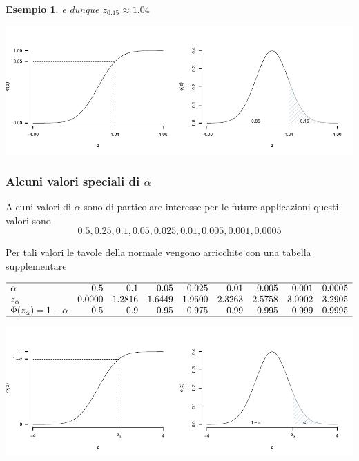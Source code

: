 \documentclass[
  11pt,
]{book}
\theoremstyle{mytheoremstyle}
\theoremstyle{mydefstyle}
\newtheorem{example}{{Esempio}}[section]
\begin{document}
\begin{example}
e dunque \(z_{0.15}\approx 1.04\)

\begin{center}\includegraphics{Appunti_di_Statistica_2025_files/figure-latex/07c-Normale-29,-1} \end{center}

\end{example}

\subsubsection{\texorpdfstring{Alcuni valori speciali di \(\alpha\)}{Alcuni valori speciali di \textbackslash alpha}}\label{alcuni-valori-speciali-di-alpha}

Alcuni valori di \(\alpha\) sono di particolare interesse per le future applicazioni questi valori sono
\[0.5,  0.25,   0.1,    0.05,   0.025,  0.01,   0.005,  0.001,  0.0005\]

Per tali valori le tavole della normale vengono arricchite con una tabella supplementare

\[\begin{array}{lrrrrrrrr}
\hline
\alpha & 0.5 & 0.1 & 0.05 & 0.025 & 0.01 & 0.005 & 0.001 & 0.0005 \\
z_\alpha & 0.0000 & 1.2816 & 1.6449 & 1.9600 & 2.3263 & 2.5758 & 3.0902 & 3.2905 \\
\Phi(z_\alpha)=1-\alpha & 0.5 & 0.9 & 0.95 & 0.975 & 0.99 & 0.995 & 0.999 & 0.9995 \\
\hline
\end{array}\]

\begin{center}\includegraphics{Appunti_di_Statistica_2025_files/figure-latex/07c-Normale-30,-1} \end{center}
\end{document}

